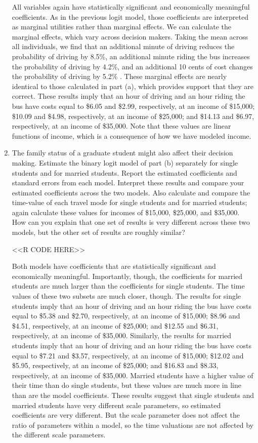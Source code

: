 \documentclass[11pt,letterpaper]{article}
\begin{document}
\begin{enumerate}[label=\alph*., leftmargin=*]
	All variables again have statistically significant and economically meaningful coefficients. As in the previous logit model, those coefficients are interpreted as marginal utilities rather than marginal effects. We can calculate the marginal effects, which vary across decision makers. Taking the mean across all individuals, we find that an additional minute of driving reduces the probability of driving by 8.5\%, an additional minute riding the bus increases the probability of driving by 4.2\%, and an additional 10 cents of cost changes the probability of driving by 5.2\% . These marginal effects are nearly identical to those calculated in part (a), which provides support that they are correct. These results imply that an hour of driving and an hour riding the bus have costs equal to \$6.05 and \$2.99, respectively, at an income of \$15,000; \$10.09 and \$4.98, respectively, at an income of \$25,000; and \$14.13 and \$6.97, respectively, at an income of \$35,000. Note that these values are linear functions of income, which is a consequence of how we have modeled income.
	
	\item The family status of a graduate student might also affect their decision making. Estimate the binary logit model of part (b) separately for single students and for married students. Report the estimated coefficients and standard errors from each model. Interpret these results and compare your estimated coefficients across the two models. Also calculate and compare the time-value of each travel mode for single students and for married students; again calculate these values for incomes of \$15,000, \$25,000, and \$35,000. How can you explain that one set of results is very different across these two models, but the other set of results are roughly similar?

	<<R CODE HERE>>

	Both models have coefficients that are statistically significant and economically meaningful. Importantly, though, the coefficients for married students are much larger than the coefficients for single students. The time values of these two subsets are much closer, though. The results for single students imply that an hour of driving and an hour riding the bus have costs equal to \$5.38 and \$2.70, respectively, at an income of \$15,000; \$8.96 and \$4.51, respectively, at an income of \$25,000; and \$12.55 and \$6.31, respectively, at an income of \$35,000. Similarly, the results for married students imply that an hour of driving and an hour riding the bus have costs equal to \$7.21 and \$3.57, respectively, at an income of \$15,000; \$12.02 and \$5.95, respectively, at an income of \$25,000; and \$16.83 and \$8.33, respectively, at an income of \$35,000. Married students have a higher value of their time than do single students, but these values are much more in line than are the model coefficients. These results suggest that single students and married students have very different scale parameters, so estimated coefficients are very different. But the scale parameter does not affect the ratio of parameters within a model, so the time valuations are not affected by the different scale parameters.
	

\end{enumerate}
\end{document}
